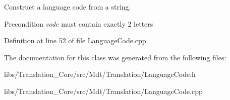 Construct a language code from a string. 

\begin{DoxyPrecond}{Precondition}
{\itshape code} must contain exactly 2 letters 
\end{DoxyPrecond}


Definition at line 52 of file Language\+Code.\+cpp.



The documentation for this class was generated from the following files\+:\begin{DoxyCompactItemize}
\item 
libs/\+Translation\+\_\+\+Core/src/\+Mdt/\+Translation/Language\+Code.\+h\item 
libs/\+Translation\+\_\+\+Core/src/\+Mdt/\+Translation/Language\+Code.\+cpp\end{DoxyCompactItemize}

